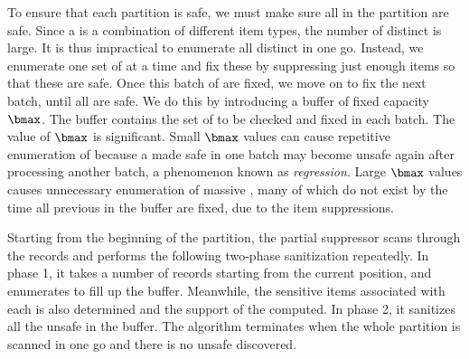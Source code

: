 To ensure that each partition is safe, we must make sure all \qids in the
partition are safe. Since a \qid is a combination of different item types,
the number of distinct \qids is large. It is thus impractical to enumerate all
distinct \qids in one go. Instead, we enumerate one set of \qids at a time
and fix these \qids by suppressing just enough items so that these \qids are
safe. Once this batch of \qids are fixed, we move on to fix the next batch,
until all \qids are safe. We do this by introducing a \qid buffer of fixed
capacity $\bmax$. The \qid buffer contains the set of \qids to be checked and
fixed in each batch. The value of $\bmax$ is significant. Small $\bmax$
values can cause repetitive enumeration of \qids because a \qid made safe in
one batch may become unsafe again after processing another batch, a
phenomenon known as {\em regression}. Large $\bmax$ values causes unnecessary
enumeration of massive \qids, many of which do not exist
by the time all previous \qids in the buffer are fixed, due to the item
suppressions.


Starting from the beginning of the partition,
the partial suppressor scans through the records and performs
the following two-phase sanitization repeatedly. In phase 1,
it takes a number of records starting from the current position, and enumerates
\qids to fill up the \qid buffer. Meanwhile, the sensitive items associated with
each \qid is also determined and the support of the \qid computed.
In phase 2, it sanitizes all the unsafe \qids in the buffer.
The algorithm terminates when the whole partition is scanned in one go
and there is no unsafe \qid discovered.

